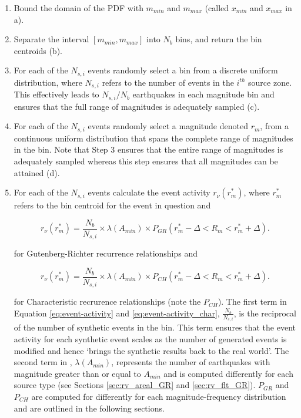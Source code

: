 \begin{enumerate}
\item Bound the domain of the PDF with $m_{min}$ and $m_{max}$
(called $x_{min}$ and $x_{max}$ in a).

\item Separate the interval $[m_{min}, m_{max}]$ into $N_b$ bins,
and return the bin centroids (b).

\item For each of the $N_{s,i}$ events randomly select a bin from
a discrete uniform
  distribution, where $N_{s,i}$ refers to the number of events in the $i^{th}$ source zone.
  This effectively leads to $N_{s,i}/N_b$ earthquakes in
  each magnitude bin and ensures that the full range of magnitudes
  is adequately sampled (c).

\item For each of the $N_{s,i}$ events randomly select a magnitude
denoted $r_m$, from a
  continuous uniform distribution that spans the complete range of magnitudes in the
  bin. Note that Step 3 ensures that the entire range of magnitudes is
  adequately sampled whereas this step ensures that all magnitudes can be
  attained (d).

\item For each of the $N_{s,i}$ events calculate the event
activity $r_\nu(r_m^*)$, where $r_m^*$ refers to the bin centroid
for the event in question and

\begin{equation}
\label{eq:event-activity} r_\nu(r_m^*) = \frac{N_b}{N_{s,i}}
\times \lambda(A_{min}) \times
P_{GR}(r_m^*-\Delta<R_m<r_m^*+\Delta).
\end{equation}

for Gutenberg-Richter recurrence relationships and

\begin{equation}
\label{eq:event-activity_char} r_\nu(r_m^*) = \frac{N_b}{N_{s,i}}
\times \lambda(A_{min}) \times
P_{CH}(r_m^*-\Delta<R_m<r_m^*+\Delta).
\end{equation}

for Characteristic recrurence relationships (note the $P_{CH}$). The first term in Equation \ref{eq:event-activity} and \ref{eq:event-activity_char}, $\frac{N_b}{N_{s,i}}$,
is the reciprocal of the number of synthetic events in
the bin. This term ensures that the event activity for each
synthetic event scales as the number of generated events is
modified and hence `brings the synthetic results back to the real
world'. The second term in ,
$\lambda(A_{min})$, represents the number
of earthquakes with magnitude greater than or equal to
$A_{min}$ and is computed differently for each source type (see Sections \ref{sec:rv_areal_GR} and \ref{sec:rv_flt_GR}). $P_{GR}$ and $P_{CH}$ are computed for 
differently for each magnitude-frequency distribution and are outlined in the following sections.


\end{enumerate}
